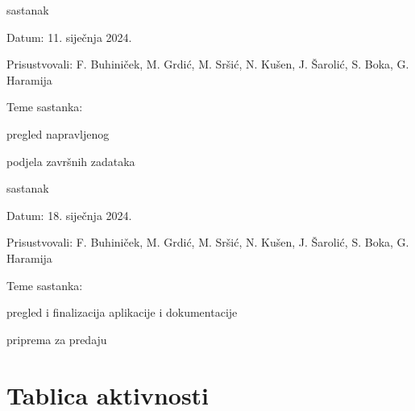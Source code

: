 \begin{packed_enum}
			\item  sastanak
			\item[] \begin{packed_item}
				\item Datum: 11. siječnja 2024.
				\item Prisustvovali: F. Buhiniček, M. Grdić, M. Sršić, N. Kušen, J. Šarolić, S. Boka, G. Haramija
				\item Teme sastanka:
				\begin{packed_item}
					\item  pregled napravljenog
					\item podjela završnih zadataka
				\end{packed_item}
			\end{packed_item}
			
			\item  sastanak
			\item[] \begin{packed_item}
				\item Datum: 18. siječnja 2024.
				\item Prisustvovali: F. Buhiniček, M. Grdić, M. Sršić, N. Kušen, J. Šarolić, S. Boka, G. Haramija
				\item Teme sastanka:
				\begin{packed_item}
					\item pregled i finalizacija aplikacije i dokumentacije
					\item priprema za predaju
				\end{packed_item}
			\end{packed_item}
			
		\end{packed_enum}
		
		\eject
		\section*{Tablica aktivnosti}
		

